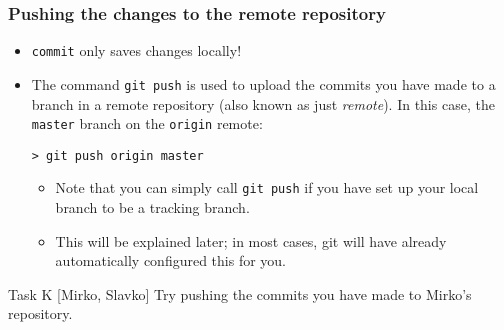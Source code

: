 
\begin{frame}[fragile]
	\frametitle{Pushing the changes to the remote repository}
	
	\begin{itemize}
	\item \texttt{commit} only saves changes \alert{locally}!
	\item The command \texttt{git push} is used to upload the commits you have made to a branch in a remote repository (also known as just \textit{remote}). In this case, the \texttt{master} branch on the \texttt{origin} remote:
	
	\begin{verbatim}
> git push origin master
	\end{verbatim}
	\begin{itemize}
	\item Note that you can simply call \texttt{git push} if you have set up your local branch to be a tracking branch.
	\item This will be explained later; in most cases, git will have already automatically configured this for you.
	\end{itemize}
	\end{itemize}

	\begin{block}{Task K [Mirko, Slavko]}
	Try pushing the commits you have made to Mirko's repository.
	\end{block}

	
\end{frame}



